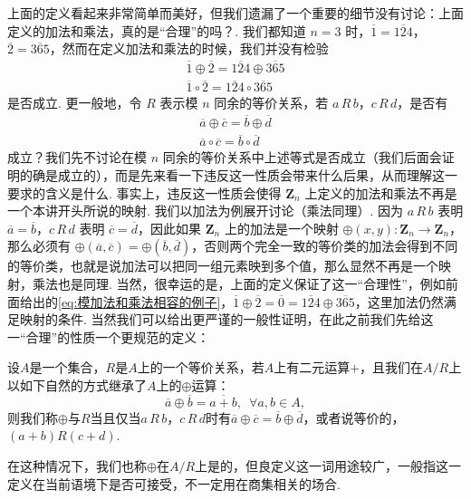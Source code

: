 上面的定义看起来非常简单而美好，但我们遗漏了一个重要的细节没有讨论：上面定义的加法和乘法，真的是``合理''的吗？. 我们都知道 $n = 3$ 时，$\overline{1} = \overline{124}$，$\overline{2} = \overline{365}$，然而在定义加法和乘法的时候，我们并没有检验
\begin{gather} \label{eq:模加法和乘法相容的例子}
    \overline{1} \oplus \overline{2} = \overline{124} \oplus \overline{365} \\
    \overline{1} \circ \overline{2} = \overline{124} \circ \overline{365}
\end{gather}
是否成立. 更一般地，令 $R$ 表示模 $n$ 同余的等价关系，若 $a\,R\,b$，$c\,R\,d$，是否有
\begin{gather*}
    \overline{a} \oplus \overline{c} = \overline{b} \oplus \overline{d} \\
    \overline{a} \circ \overline{c} = \overline{b} \circ \overline{d}
\end{gather*}
成立？我们先不讨论在模 $n$ 同余的等价关系中上述等式是否成立（我们后面会证明的确是成立的），而是先来看一下违反这一性质会带来什么后果，从而理解这一要求的含义是什么. 事实上，违反这一性质会使得 $\mathbf{Z}_n$ 上定义的加法和乘法不再是一个本讲开头所说的映射. 我们以加法为例展开讨论（乘法同理）. 因为 $a\,R\,b$ 表明 $\overline{a} = \overline{b}$，$c\,R\,d$ 表明 $\overline{c} = \overline{d}$，因此如果 $\mathbf{Z}_n$ 上的加法是一个映射 $\oplus(x,y) \colon \mathbf{Z}_n \to \mathbf{Z}_n$，那么必须有 $\oplus(\overline{a},\overline{c}) = \oplus(\overline{b},\overline{d})$，否则两个完全一致的等价类的加法会得到不同的等价类，也就是说加法可以把同一组元素映到多个值，那么显然不再是一个映射，乘法也是同理. 当然，很幸运的是，上面的定义保证了这一``合理性''，例如前面给出的\autoref{eq:模加法和乘法相容的例子}，$\overline{1} \oplus \overline{2} = \overline{0} = \overline{124} \oplus \overline{365}$，这里加法仍然满足映射的条件. 当然我们可以给出更严谨的一般性证明，在此之前我们先给这一``合理''的性质一个更规范的定义：
\begin{definition}{}{}
    设$A$是一个集合，$R$是$A$上的一个等价关系，若$A$上有二元运算$+$，且我们在$A/R$上以如下自然的方式继承了$A$上的$\oplus$运算：
    \[\overline{a}\oplus\overline{b}=\overline{a+b},\enspace\forall a,b\in A,\]
    则我们称$\oplus$与$R$当且仅当$a\,R\,b$，$c\,R\,d$时有$\overline{a}\oplus\overline{c}=\overline{b}\oplus\overline{d}$，或者说等价的，$(a+b)R(c+d)$.
\end{definition}

在这种情况下，我们也称$\oplus$在$A/R$上是的，但良定义这一词用途较广，一般指这一定义在当前语境下是否可接受，不一定用在商集相关的场合.

